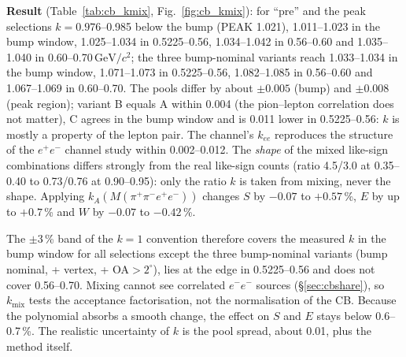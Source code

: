 \documentclass[11pt,a4paper]{article}
\newcommand{\ee}{\ensuremath{e^{+}e^{-}}\xspace}
\newcommand{\Mfour}{\ensuremath{M(\pi^{+}\pi^{-}e^{+}e^{-})}\xspace}
\newcommand{\GeVcc}{\ensuremath{\mathrm{GeV}/c^{2}}\xspace}
\begin{document}
\textbf{Result} (Table~\ref{tab:cb_kmix}, Fig.~\ref{fig:cb_kmix}): for ``pre'' and the peak selections $k=0.976$--0.985
below the bump (PEAK 1.021), 1.011--1.023 in the bump window, 1.025--1.034 in 0.5225--0.56, 1.034--1.042 in 0.56--0.60 and
1.035--1.040 in 0.60--0.70\,\GeVcc; the three bump-nominal variants reach 1.033--1.034 in the bump window, 1.071--1.073 in
0.5225--0.56, 1.082--1.085 in 0.56--0.60 and 1.067--1.069 in 0.60--0.70. The pools differ by about $\pm0.005$ (bump)
and $\pm0.008$ (peak region); variant B equals A within 0.004 (the pion--lepton correlation does not matter), C agrees
in the bump window and is 0.011 lower in 0.5225--0.56: $k$ is mostly a property of the lepton pair. The channel's
$k_{ee}$ reproduces the structure of the \ee channel study within 0.002--0.012. The \emph{shape} of the mixed like-sign
combinations differs strongly from the real like-sign counts (ratio 4.5/3.0 at 0.35--0.40 to 0.73/0.76 at 0.90--0.95):
only the ratio $k$ is taken from mixing, never the shape. Applying $k_A(\Mfour)$ changes $S$ by $-0.07$ to $+0.57$\,\%,
$E$ by up to $+0.7$\,\% and $W$ by $-0.07$ to $-0.42$\,\%.

The $\pm3$\,\% band of the $k=1$ convention therefore covers the measured $k$ in the bump window for all selections
except the three bump-nominal variants (bump nominal, + vertex, + OA$>2^\circ$), lies at the edge in 0.5225--0.56 and does
not cover 0.56--0.70. Mixing cannot see correlated $e^-e^-$ sources (\S\ref{sec:cbshare}), so $k_{\mathrm{mix}}$ tests the
acceptance factorisation, not the normalisation of the CB. Because the polynomial absorbs a
smooth change, the effect on $S$ and $E$ stays below 0.6--0.7\,\%. The realistic uncertainty of $k$ is the pool
spread, about 0.01, plus the method itself.


\end{document}
